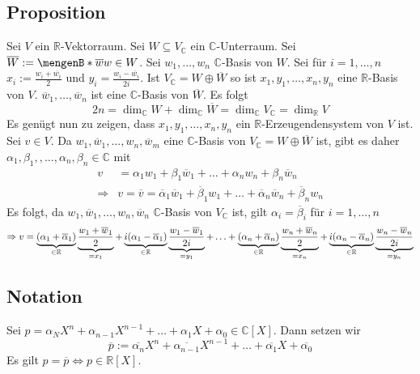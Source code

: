 \subsection[Proposition: Erhalten einer $\mathds{R}$-Basis von $V$ durch die Komplemente von $V_\mathds{C}$]{Proposition} %
\label{sub:11.4}
Sei $V$ ein $\mathds{R}$-Vektorraum. Sei $W	\subseteq V_\mathds{C}$ ein $\mathds{C}$-Unterraum. Sei $\overline{W} := \set[\overline{w}]{w \in W}$. Sei 
$w_1, \ldots , w_n$ $\mathds{C}$-Basis von $W$. Sei für $i=1, \ldots ,n$ $x_i := \frac{w_i + \overline{w_i} }{2}$ und $y_i = \frac{w_i - \overline{w_i} }{2i}$.
Ist $V_\mathds{C}= W \oplus \overline{W}$ so ist $x_1, y_1, \ldots , x_n, y_n$ eine $\mathds{R}$-Basis von $V$.
$\overline{w}_1 , \ldots , \overline{w}_n$ ist eine $\mathds{C}$-Basis von $\overline{W}$. Es folgt 
\[
	2 n = \dim_\mathds{C} W + \dim_\mathds{C} \overline{W} = \dim_\mathds{C} V_\mathds{C} = \dim_\mathds{R} V
\]
Es genügt nun zu zeigen, dass $x_1, y_1, \ldots , x_n, y_n$ ein $\mathds{R}$-Erzeugendensystem von $V$ ist. Sei $v \in V$. Da 
$w_1, \overline{w}_1 , \ldots , w_n, \overline{w}_m $ eine $\mathds{C}$-Basis von $V_\mathds{C} = W \oplus \overline{W} $ ist, gibt es daher 
$\alpha_1, \beta_1, , \ldots , \alpha_n , \beta_n \in \mathds{C}$ mit 
\begin{align*}
	v &= \alpha_1 w_1 + \beta_1 \overline{w}_1 + \ldots  + \alpha_n w_n + \beta_n \overline{w}_n  \\
	\Rightarrow & v= \overline{v} = \overline{\alpha}_1 \overline{w}_1 + \overline{\beta}_1 w_1 + \ldots + \overline{\alpha}_n \overline{w}_n + \overline{\beta}_n w_n      
\end{align*}
Es folgt, da $w_1, \overline{w}_1, \ldots , w_n, \overline{w}_n $ $\mathds{C}$-Basis von $V_\mathds{C}$ ist, gilt $\alpha_i = \overline{\beta}_i $ für $i=1, \ldots ,n$
\[
	\Rightarrow v = \underbrace{\enbrace*{\alpha_1 + \overline{\alpha}_1 }}_{\in \mathds{R}} \underbrace{\frac{w_1 + \overline{w}_1 }{2}}_{= x_1} + \underbrace{i \enbrace*{\alpha_1 - \overline{\alpha}_1 }}_{\in \mathds{R}} \underbrace{\frac{w_1 - \overline{w}_1 }{2i}}_{=y_1}    + \ldots + \underbrace{(\alpha_n + \overline{\alpha}_n )}_{\in \mathds{R}} \underbrace{\frac{w_n + \overline{w}_n }{2}}_{=x_n} + \underbrace{i (\alpha_n - \overline{\alpha}_n )}_{\in \mathds{R}} \underbrace{\frac{w_n - \overline{w}_n }{2i} }_{=y_n} 
\]
\bewende

\subsection[Notation: komplex konjugiertes Polynom]{Notation} %
\label{sub:115}
Sei $p= \alpha_N X^n + \alpha_{n-1} X^{n-1} + \ldots  + \alpha_1 X + \alpha_0 \in \mathds{C}[X]$. Dann setzen wir
\[
	\overline{p} := \overline{\alpha_n} X^n + \overline{\alpha_{n-1}} X^{n-1} + \ldots + \overline{\alpha_1} X + \overline{\alpha_0}     
\]
Es gilt $p = \overline{p} \iff p \in \mathds{R}[X] $.

